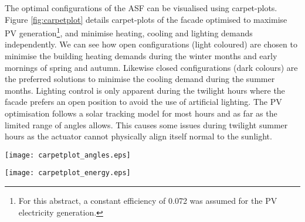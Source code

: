 


The optimal configurations of the ASF can be visualised using carpet-plots. Figure \ref{fig:carpetplot} details carpet-plots of the facade optimised to maximise PV generation\footnote{For this abstract, a constant efficiency of 0.072 was assumed for the PV electricity generation.}, and minimise heating, cooling and lighting demands independently. We can see how open configurations (light coloured) are chosen to minimise the building heating demands during the winter months and early mornings of spring and autumn. Likewise closed configurations (dark colours) are the preferred solutions to minimise the cooling demand during the summer months. Lighting control is only apparent during the twilight hours where the facade prefers an open position to avoid the use of artificial lighting. The PV optimisation follows a solar tracking model for most hours and as far as the limited range of angles allows. This causes some issues during twilight summer hours as the actuator cannot physically align itself normal to the sunlight. 




\begin{figure*}
\begin{center}
\texttt{[image: carpetplot\_angles.eps]}
\caption{A carpet plot detailing the optimal configuration to minimise the (a) heating demand, (b) cooling demand, (c) lighting demand, and (d) maximise PV generation. Each configuration is represented by an angle of orientation around the x-axis (Altitude) and y-axis (Azimuth) as seen in the legend. Figure (e) details the combinations for optimum building thermal management without PV production. (f) also includes the PV production}
\label{fig:carpetplot}
\end{center}
\end{figure*}

\begin{figure*}
\begin{center}
\texttt{[image: carpetplot\_energy.eps]}
\caption{A carpet plot detailing the net energy consumption. Each square represents the total energy consumption for that specific hour of the entire month. Red colours detail the energy demand, while blue colours detail the energy supply.}
\label{fig:carpetplot_energy}
\end{center}
\end{figure*}



